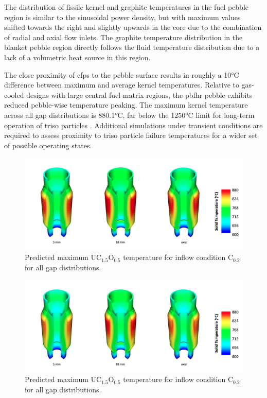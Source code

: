The distribution of fissile kernel and graphite temperatures in the fuel pebble region is similar to the sinusoidal power density, but with maximum values shifted towards the right and slightly upwards in the core due to the combination of radial and axial flow inlets. The graphite temperature distribution in the blanket pebble region directly follows the fluid temperature distribution due to a lack of a volumetric heat source in this region.

The close proximity of \glspl{cfp} to the pebble surface results in roughly a 10\si{\celsius} difference between maximum and average kernel temperatures. Relative to gas-cooled designs with large central fuel-matrix regions, the \gls{pbfhr} pebble exhibits reduced pebble-wise temperature peaking. The maximum kernel temperature across all gap distributions is 880.1\si{\celsius}, far below the 1250\si{\celsius} limit for long-term operation of \gls{triso} particles \cite{nabielek,demkowicz}. Additional simulations under transient conditions are required to assess proximity to \gls{triso} particle failure temperatures for a wider set of possible operating states. 

\begin{figure}[h!]
\centering
\includegraphics[height=0.4\linewidth]{figs/max_uo2.png}
\caption{Predicted maximum UC$_{1.5}$O$_{0.5}$ temperature for inflow condition C$_\text{0.2}$ for all gap distributions.}
\label{fig:uo2_max}
\end{figure}

\begin{figure}[h!]
\centering
\includegraphics[height=0.4\linewidth]{figs/avg_uo2.png}
\caption{Predicted maximum UC$_{1.5}$O$_{0.5}$ temperature for inflow condition C$_\text{0.2}$ for all gap distributions.}
\label{fig:uo2_avg}
\end{figure}

